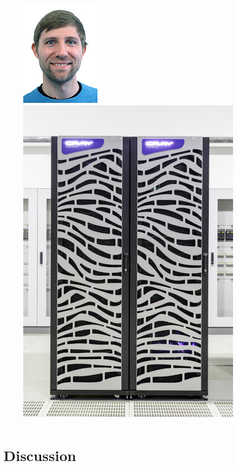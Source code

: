 \documentclass[aspectratio=1610]{beamer}
\begin{document}
\begin{frame}
\begin{columns}
\begin{column}{0.48\textwidth}
\begin{figure}
            \includegraphics[width=0.25\linewidth]{andreas.jpg}\quad \includegraphics[width=0.25\linewidth]{juron.jpg} \\
        \end{figure}
    \end{column}
\end{columns}
\end{frame}

\section{Discussion}
\label{sec:discussion}
\end{document}
